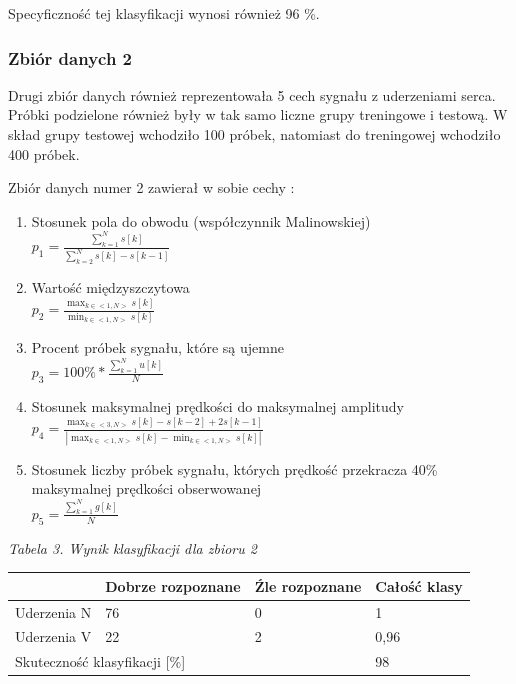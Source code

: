 \documentclass[[10pt,a4paper]{article}
\begin{document}
\begin{enumerate}
\noindent Specyficzność tej klasyfikacji wynosi również 96 \%. 

\subsubsection{Zbiór danych 2} 

\noindent Drugi zbiór danych również reprezentowała 5 cech sygnału z uderzeniami serca. Próbki podzielone również były w tak samo liczne grupy treningowe i testową. W skład grupy testowej wchodziło 100 próbek, natomiast do treningowej wchodziło 400 próbek.

\noindent Zbiór danych numer 2 zawierał w sobie cechy :

\begin{enumerate}
\item  Stosunek pola do obwodu (współczynnik Malinowskiej) 
 \\$p_1 = \frac{\sum_{k=1}^{N} s[k]}{\sum_{k=2}^{N} s[k]-s[k-1]}$

\item  Wartość międzyszczytowa
\\$p_2 = \frac{\max_{k \in <1,N>} s[k]}{\min_{k \in <1,N>} s[k]}$

\item  Procent próbek sygnału, które są ujemne    \\$p_3 = 100\% * \frac{\sum_{k=1}^{N} u[k]}{N}$ 

\item  Stosunek maksymalnej prędkości do maksymalnej amplitudy 
\\$p_4 = \frac{\max_{k \in <3,N>} s[k]-s[k-2]+2s[k-1]}{|\max_{k \in <1,N>} s[k] - \min_{k \in <1,N>} s[k]|}$

\item  Stosunek liczby próbek sygnału, których prędkość przekracza 40\% maksymalnej prędkości obserwowanej 
\\$p_5 = \frac{\sum_{k=1}^{N} g[k]}{N}$

\end{enumerate}
\textit{Tabela 3. Wynik klasyfikacji dla zbioru 2}
\newline
\begin{tabular}{|p{1.2in}|p{1.0in}|p{1.0in}|p{1.0in}|} \hline 
 & Dobrze rozpoznane & \'{Z}le rozpoznane & Całość klasy  \\ \hline 
Uderzenia N & 76 & 0 & 1 \\ \hline 
Uderzenia V & 22 & 2 & 0,96 \\ \hline 
\multicolumn{3}{|p{1in}|}{Skuteczność klasyfikacji [\%] } & 98 \\ \hline 
\end{tabular}




\end{enumerate}
\end{document}
